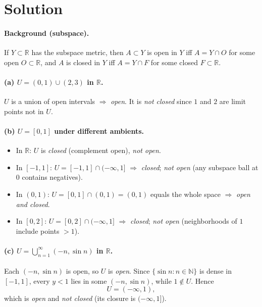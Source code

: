 \documentclass[12pt,a4paper]{article}
\begin{document}
\section*{Solution}

\paragraph{Background (subspace).}
If $Y\subset\mathbb{R}$ has the subspace metric, then $A\subset Y$ is open in $Y$ iff $A=Y\cap O$ for some open $O\subset\mathbb{R}$, and $A$ is closed in $Y$ iff $A=Y\cap F$ for some closed $F\subset\mathbb{R}$.

\paragraph{(a) $U=(0,1)\cup(2,3)$ in $\mathbb{R}$.}
$U$ is a union of open intervals $\Rightarrow$ \emph{open}.  
It is \emph{not closed} since $1$ and $2$ are limit points not in $U$.

\paragraph{(b) $U=[0,1]$ under different ambients.}
\begin{itemize}
	\item In $\mathbb{R}$: $U$ is \emph{closed} (complement open), \emph{not open}.
	\item In $[-1,1]$: $U=[-1,1]\cap(-\infty,1]$ $\Rightarrow$ \emph{closed}; \emph{not open} (any subspace ball at $0$ contains negatives).
	\item In $(0,1)$: $U=[0,1]\cap(0,1)=(0,1)$ equals the whole space $\Rightarrow$ \emph{open and closed}.
	\item In $[0,2]$: $U=[0,2]\cap(-\infty,1]$ $\Rightarrow$ \emph{closed}; \emph{not open} (neighborhoods of $1$ include points $>1$).
\end{itemize}

\paragraph{(c) $U=\displaystyle\bigcup_{n=1}^{\infty}(-n,\sin n)$ in $\mathbb{R}$.}
Each $(-n,\sin n)$ is open, so $U$ is \emph{open}.  
Since $\{\sin n:n\in\mathbb{N}\}$ is dense in $[-1,1]$, every $y<1$ lies in some $(-n,\sin n)$, while $1\notin U$. Hence
\[
U=(-\infty,1),
\]
which is \emph{open} and \emph{not closed} (its closure is $(-\infty,1]$).
\end{document}
